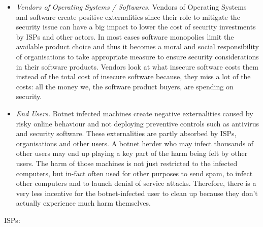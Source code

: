 \begin{itemize}
\item \textit{Vendors of Operating Systems / Softwares. } Vendors of Operating Systems and software create positive externalities since their role to mitigate the security issue can have a big impact to lower the cost of security investments by ISPs and other actors. In most cases software monopolies limit the available product choice and thus it becomes a moral and social responsibility of organisations to take appropriate measure to ensure security considerations in their software products. Vendors look at what insecure software costs them instead of the total cost of insecure software because, they miss a lot of the costs: all the money we, the software product buyers, are spending on security.
\item \textit{End Users.} Botnet infected machines create negative externalities caused by risky online behaviour and not deploying preventive controls such as antivirus and security software. These externalities are partly absorbed by ISPs, organisations and other users. A botnet herder who may infect thousands of other users may end up playing a key part of the harm being felt by other users. The harm of those machines is not just restricted to the infected computers, but in-fact often used for other purposes to send spam, to infect other computers and to launch denial of service attacks. Therefore, there is a very less incentive for the botnet-infected user to clean up because they don’t actually experience much harm themselves.
\end{itemize}




ISPs:

